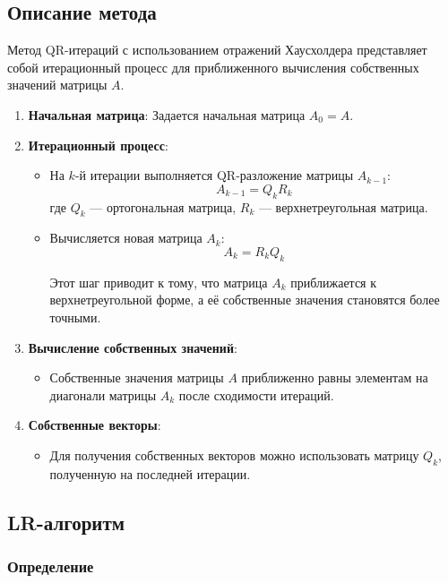 \documentclass{article}
\begin{document}
\subsection*{Описание метода}

Метод QR-итераций с использованием отражений Хаусхолдера представляет собой итерационный процесс для приближенного вычисления собственных значений матрицы \( A \).

\begin{enumerate}
  \item \textbf{Начальная матрица}: Задается начальная матрица \( A_0 = A \).
  
  \item \textbf{Итерационный процесс}:
    \begin{itemize}
      \item На \( k \)-й итерации выполняется QR-разложение матрицы \( A_{k-1} \):
      \[ A_{k-1} = Q_k R_k \]
      где \( Q_k \) — ортогональная матрица, \( R_k \) — верхнетреугольная матрица.
      
      \item Вычисляется новая матрица \( A_k \):
      \[ A_k = R_k Q_k \]
      
      Этот шаг приводит к тому, что матрица \( A_k \) приближается к верхнетреугольной форме, а её собственные значения становятся более точными.
    \end{itemize}
  
  \item \textbf{Вычисление собственных значений}:
    \begin{itemize}
      \item Собственные значения матрицы \( A \) приближенно равны элементам на диагонали матрицы \( A_k \) после сходимости итераций.
    \end{itemize}
  
  \item \textbf{Собственные векторы}:
    \begin{itemize}
      \item Для получения собственных векторов можно использовать матрицу \( Q_k \), полученную на последней итерации.
    \end{itemize}
\end{enumerate}
\subsection{LR-алгоритм}

\subsubsection{Определение}
\end{document}

